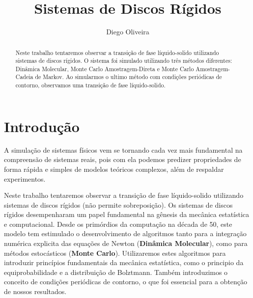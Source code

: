\documentclass[%
reprint,
amsmath,amssymb,
aps,
12pt
]{revtex4-1}
\begin{document}
	
	
	\title{Sistemas de Discos Rígidos}%
	
	\author{Diego Oliveira}
	
	
	\begin{abstract}
	Neste trabalho tentaremos observar a transição de fase líquido-solido utilizando sistemas de discos rígidos. O sistema foi simulado utilizando três métodos diferentes: Dinâmica Molecular, Monte Carlo Amostragem-Direta e Monte Carlo Amostragem-Cadeia de Markov. Ao simularmos o ultimo método com condições periódicas de contorno, observamos uma transição de fase líquido-solido.
	\end{abstract}
	
\maketitle


\maketitle
\renewcommand{\thesection}{\arabic{section}}
\renewcommand{\thesubsection}{\thesection.\arabic{subsection}}
\renewcommand{\thesubsubsection}{\thesubsection.\arabic{subsubsection}}

\makeatletter
\renewcommand{\p@subsection}{}
\renewcommand{\p@subsubsection}{}
\makeatother
	
\section{Introdução}
A simulação de sistemas físicos vem se tornando cada vez mais fundamental na compreensão de sistemas reais, pois com ela podemos predizer propriedades de forma rápida e simples de modelos teóricos complexos, além de respaldar experimentos.

Neste trabalho tentaremos observar a transição de fase líquido-solido utilizando sistemas de discos rígidos (não permite sobreposição). Os sistemas de discos rígidos desempenharam um papel fundamental na gênesis da mecânica estatística e computacional. Desde os primórdios da computação na década de 50, este modelo tem estimulado o desenvolvimento de algoritmos tanto para a integração numérica explicita das equações de Newton (\textbf{Dinâmica Molecular}), como para métodos estocásticos (\textbf{Monte Carlo}). Utilizaremos estes algoritmos para introduzir princípios fundamentais da mecânica estatística, como o principio da equiprobabilidade e a distribuição de Bolztmann. Também introduzimos o conceito de condições periódicas de contorno, o que foi essencial para a obtenção de nossos resultados.
\end{document}
